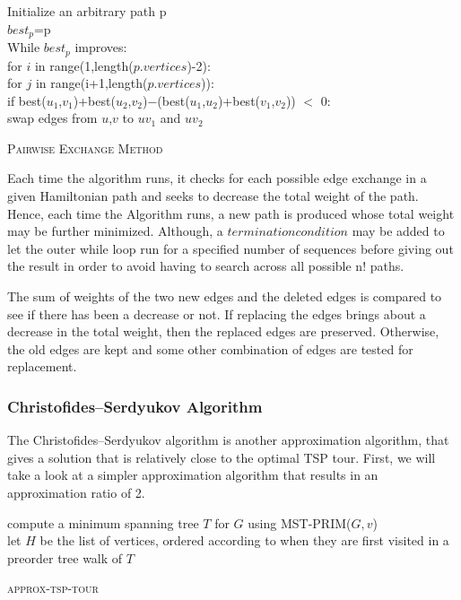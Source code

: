 \documentclass[11pt]{article}
\begin{document}
    \begin{algorithm*}
        Initialize an arbitrary path p \\
        $best_p$=p \\
        While $best_p$ improves: \\
        for $i$ in range(1,length($p.vertices$)-2): \\
        \quad for $j$ in range(i+1,length($p.vertices$)):\\
        \qquad if best($u_{1}$,$v_{1}$)+best($u_{2}$,$v_{2}$)$-$(best($u_{1}$,$u_{2}$)+best($v_{1}$,$v_{2}$)) $<$ 0:\\
        swap edges from $u$,$v$ to $uv_{1}$ and $uv_{2}$\\
    \caption{\textsc{Pairwise Exchange Method}}
    \end{algorithm*}        
    
    Each time the algorithm runs, it checks for each possible edge exchange in a given Hamiltonian path and seeks to decrease the total weight of the path. Hence, each time the Algorithm runs, a new path is produced whose total weight may be further minimized. Although, a $termination condition$ may be added to let the outer while loop run for a specified number of sequences before giving out the result in order to avoid having to search across all possible n! paths.

    The sum of weights of the two new edges and the deleted edges is compared to see if there has been a decrease or not. If replacing the edges brings about a decrease in the total weight, then the replaced edges are preserved. Otherwise, the old edges are kept and some other combination of edges are tested for replacement.

    \newpage
    \subsubsection {Christofides–Serdyukov Algorithm}
    The Christofides–Serdyukov algorithm is another approximation algorithm, that gives a solution that is 
    relatively close to the optimal TSP tour. First, we will take a look at a simpler approximation 
    algorithm that results in an approximation ratio of 2.

    \begin{algorithm*}
      compute a minimum spanning tree $T$ for $G$ using \textsc{MST-PRIM}($G, v$) \\
      let $H$ be the list of vertices, ordered according to when they are first visited in a
      preorder tree walk of $T$ \\
  \caption{\textsc{approx-tsp-tour}}
  \end{algorithm*}
    
\end{document}
